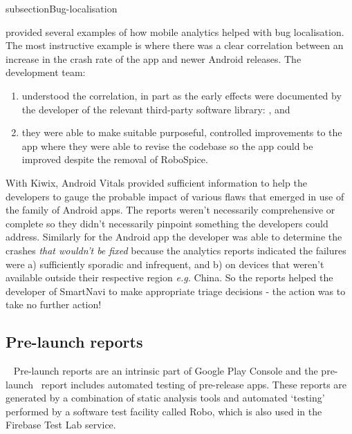 subsection{Bug-localisation}

 provided several examples of how mobile analytics helped with bug localisation. The most instructive example is where there was a clear correlation between an increase in the crash rate of the app and newer Android releases. The development team:

\begin{enumerate}[label=(\alph*)]
    \item understood the correlation, in part as the early effects were documented by the developer of the relevant third-party software library: , and 
    \item they were able to make suitable purposeful, controlled improvements to the app where they were able to revise the codebase so the app could be improved despite the removal of RoboSpice.
\end{enumerate}

With Kiwix, Android Vitals provided sufficient information to help the developers to gauge the probable impact of various flaws that emerged in use of the family of Android apps. The reports weren't necessarily comprehensive or complete so they didn't necessarily pinpoint something the developers could address. Similarly for the  Android app the developer was able to determine the crashes \emph{that wouldn't be fixed} because the analytics reports indicated the failures were a) sufficiently sporadic and infrequent, and b) on devices that weren't available outside their respective region \emph{e.g.} China. So the reports helped the developer of SmartNavi to make appropriate triage decisions - the action was to take no further action! 

\subsection{Pre-launch reports}~\label{tata-pre-launch-reports-topic}
Pre-launch reports are an intrinsic part of Google Play Console and the pre-launch~ report includes automated testing of pre-release apps. These reports are generated by a combination of static analysis tools and automated `testing' performed by a software test facility called Robo, which is also used in the Firebase Test Lab service.

